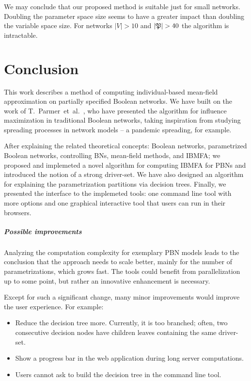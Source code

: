 \documentclass[
	digital, oneside, nosansbold, nocolorbold, nolot, nolof
]{fithesis4}
\theoremstyle{definition}
\theoremstyle{definition}
\begin{document}
\medskip

We may conclude that our proposed method is suitable just for
small networks. Doubling the parameter space size seems to have a greater impact
than doubling the variable space size. For networks $|V| > 10$ and
$|\mathfrak{P}| > 40$ the algorithm is intractable.

\chapter{Conclusion}

This work describes a method of computing individual-based mean-field
approximation on partially specified Boolean networks. We have built on the
work of T.~Parmer~et~al.~\cite{infl_max_BN}, who have presented the algorithm
for influence maximization in traditional Boolean networks, taking inspiration
from studying spreading processes in network models -- a pandemic spreading,
for example.

After explaining the related theoretical concepts: Boolean networks,
parametrized Boolean networks, controlling BNs, mean-field methods, and IBMFA;
we proposed and implemeted a novel algorithm for computing IBMFA for PBNs and
introduced the notion of a strong driver-set. We have also designed an
algorithm for explaining the parametrization partitions via decision trees.
Finally, we presented the interface to the implemeted tools: one command line
tool with more options and one graphical interactive tool that users can run in
their browsers.

\paragraph{Possible improvements}

Analyzing the computation complexity for exemplary PBN models leads to the
conclusion that the approach needs to scale better, mainly for the number of
parametrizations, which grows fast. The tools could benefit from
parallelization up to some point, but rather an innovative enhancement is
necessary.

Except for such a significant change, many minor improvements would improve the
user experience. For example:
\begin{itemize}
\item Reduce the decision tree more. Currently, it is too branched; often, two
    consecutive decision nodes have children leaves containing the same
    driver-set.
\item Show a progress bar in the web application during long server
    computations.
\item Users cannot ask to build the decision tree in the command line tool.
\end{itemize}


\end{document}
